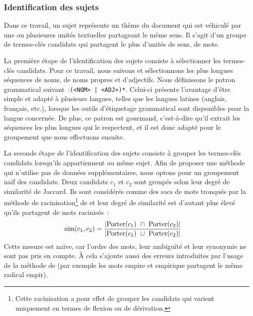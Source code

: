       \subsubsection{Identification des sujets}
      \label{subsubsec:main-automatic_keyphrase_annotation-unsupervised_automatic_keyphrase_extraction-topicrank-topic_identification}
        Dans ce travail, un sujet représente un thème du document qui est
        véhiculé par une ou plusieures unités textuelles partageant le même
        sens. Il s'agit d'un groupe de termes-clés candidats qui partagent le
        plus d'unités de sens, de mots.

        La première étape de l'identification des sujets consiste à sélectionner
        les termes-clés candidats.
        Pour ce travail, nous suivons  et
        sélectionnons les plus longues séquences de noms, de noms propres et
        d'adjectifs. Nous définissons le patron grammatical
        suivant~:\texttt{(<NOM> | <ADJ>)*}. Celui-ci présente l'avantage d'être simple
        et adapté à plusieurs langues, telles que les langues latines (anglais, français, etc.), lorsque les
        outils d'étiquetage grammatical sont disponibles pour la langue
        concernée. De plus, ce patron est gourmand, c'est-à-dire qu'il extrait
        les séquences les plus longues qui le respectent, et il est donc adapté
        pour le groupement que nous effectuons ensuite.

        La seconde étape de l'identification des sujets consiste à grouper les
        termes-clés candidats lorsqu'ils appartiennent au même sujet. Afin de
        proposer une méthode qui n'utilise pas de données
        supplémentaires, nous optons pour un groupement naïf des
        candidats. Deux candidats $c_1$ et $c_2$ sont groupés selon leur degré
        de similarité de Jaccard. Ils sont considérés comme des sacs de
        mots tronqués par la méthode de racinisation\footnote{Cette
        racinisation a pour effet de grouper les candidats qui varient
        uniquement en termes de flexion ou de dérivation.} de
         et leur degré de similarité est
        d'autant plus élevé qu'ils partagent de mots racinisés~:
        \begin{align}
          \text{sim}(c_1, c_2) &= \frac{|\textnormal{Porter}(c_1)\ \cap\ \textnormal{Porter}(c_2)|}{|\textnormal{Porter}(c_1)\ \cup\ \textnormal{Porter}(c_2)|} \label{equa:jaccard}
        \end{align}
        Cette mesure est naïve, car l'ordre des mots, leur ambiguïté
        et leur synonymie ne sont pas pris en compte. À cela s'ajoute
        aussi des erreurs introduites par l'usage de la méthode de
         (par exemple les mots
        \og{}empire\fg{} et \og{}empirique\fg{} partagent le même radical
        \og{}empir\fg{}).

